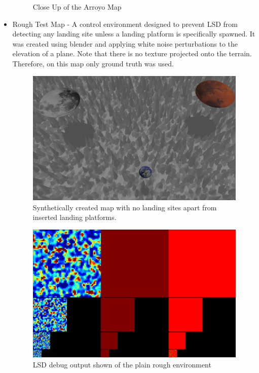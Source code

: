 \begin{itemize}
\begin{figure}[h]
        \caption{Close Up of the Arroyo Map}
        \label{fig:sim_view_arroyo}
    \end{figure}
    \item Rough Test Map - A control environment designed to prevent LSD from detecting any landing site unless a landing platform is specifically spawned. It was created using blender and applying white noise perturbations to the elevation of a plane. Note that there is no texture projected onto the terrain. Therefore, on this map only ground truth was used.
    \begin{figure}[h]
        \centering
        \includegraphics[scale=0.285]{images/evaluation/rough_test_map.png}
        \caption{Synthetically created map with no landing sites apart from inserted landing platforms.}
    \end{figure}
    \begin{figure}[h]
        \centering
        \includegraphics[scale=0.25]{images/evaluation/rough_map_LSD.png}
        \caption{LSD debug output shown of the plain rough environment}

\end{figure}
\end{itemize}
